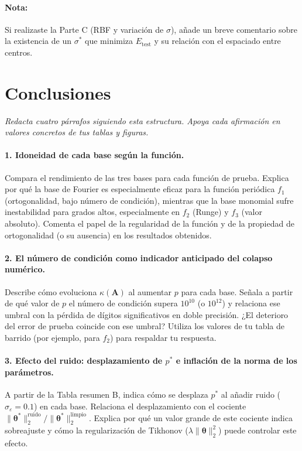 \paragraph*{Nota:} Si realizaste la Parte C (RBF y variación de \(\sigma\)), añade un breve comentario sobre la existencia de un \(\sigma^*\) que minimiza \(E_{\mathrm{test}}\) y su relación con el espaciado entre centros.

\section*{Conclusiones}
\label{sec:conclusiones}

\textit{Redacta cuatro párrafos siguiendo esta estructura. Apoya cada afirmación en valores concretos de tus tablas y figuras.}

\paragraph*{1. Idoneidad de cada base según la función.}
Compara el rendimiento de las tres bases para cada función de prueba. Explica por qué la base de Fourier es especialmente eficaz para la función periódica \(f_1\) (ortogonalidad, bajo número de condición), mientras que la base monomial sufre inestabilidad para grados altos, especialmente en \(f_2\) (Runge) y \(f_3\) (valor absoluto). Comenta el papel de la regularidad de la función y de la propiedad de ortogonalidad (o su ausencia) en los resultados obtenidos.

\paragraph*{2. El número de condición como indicador anticipado del colapso numérico.}
Describe cómo evoluciona \(\kappa(\mathbf{A})\) al aumentar \(p\) para cada base. Señala a partir de qué valor de \(p\) el número de condición supera \(10^{10}\) (o \(10^{12}\)) y relaciona ese umbral con la pérdida de dígitos significativos en doble precisión. ¿El deterioro del error de prueba coincide con ese umbral? Utiliza los valores de tu tabla de barrido (por ejemplo, para \(f_2\)) para respaldar tu respuesta.

\paragraph*{3. Efecto del ruido: desplazamiento de \(p^*\) e inflación de la norma de los parámetros.}
A partir de la Tabla resumen B, indica cómo se desplaza \(p^*\) al añadir ruido (\(\sigma_\varepsilon = 0.1\)) en cada base. Relaciona el desplazamiento con el cociente \(\|\boldsymbol{\theta}^*\|_2^{\text{ruido}} / \|\boldsymbol{\theta}^*\|_2^{\text{limpio}}\). Explica por qué un valor grande de este cociente indica sobreajuste y cómo la regularización de Tikhonov (\(\lambda\|\boldsymbol{\theta}\|_2^2\)) puede controlar este efecto.

